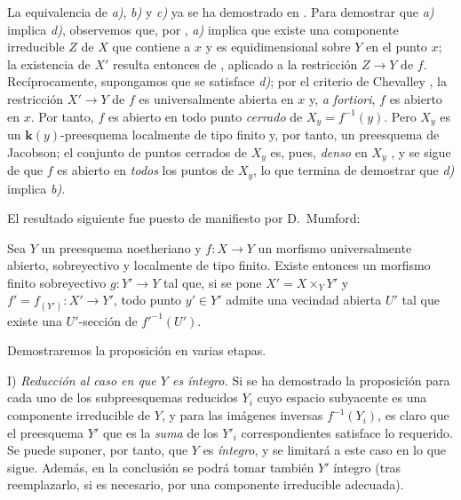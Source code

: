 La equivalencia de \emph{a)}, \emph{b)} y \emph{c)} ya se ha demostrado en .
Para demostrar que \emph{a)} implica \emph{d)}, observemos que, por , \emph{a)} implica que existe una componente irreducible $Z$ de $X$ que contiene a $x$ y es equidimensional sobre $Y$ en el punto $x$; la existencia de $X'$ resulta entonces de , aplicado a la restricción $Z\to Y$ de $f$.
Recíprocamente, supongamos que se satisface \emph{d)}; por el criterio de Chevalley , la restricción $X'\to Y$ de $f$ es universalmente abierta en $x$ y, \emph{a fortiori}, $f$ es abierto en $x$. Por tanto, $f$ es abierto en todo punto \emph{cerrado} de $X_y=f^{-1}(y)$.
Pero $X_y$ es un $\boldsymbol{k}(y)$-preesquema localmente de tipo finito y, por tanto, un preesquema de Jacobson; el conjunto de puntos cerrados de $X_y$ es, pues, \emph{denso} en $X_y$ , y se sigue de  que $f$ es abierto en \emph{todos} los puntos de $X_y$, lo que termina de demostrar que \emph{d)} implica \emph{b)}.

El resultado siguiente fue puesto de manifiesto por D.\ Mumford:

\begin{proposition}[14.5.10]
\label{IV.14.5.10}

Sea $Y$ un preesquema noetheriano y $f:X\to Y$ un morfismo universalmente abierto, sobreyectivo y localmente de tipo finito.
Existe entonces un morfismo finito sobreyectivo $g:Y'\to Y$ tal que, si se pone $X'=X\times_Y Y'$ y $f'=f_{(Y')}:X'\to Y'$, todo punto $y'\in Y'$ admite una vecindad abierta $U'$ tal que existe una $U'$-sección de $f'^{-1}(U')$.
\end{proposition}

Demostraremos la proposición en varias etapas.


I) \emph{Reducción al caso en que $Y$ es íntegro.}
Si se ha demostrado la proposición para cada uno de los subpreesquemas reducidos $Y_i$ cuyo espacio subyacente es una componente irreducible de $Y$, y para las imágenes inversas $f^{-1}(Y_i)$, es claro que el preesquema $Y'$ que es la \emph{suma} de los $Y'_i$ correspondientes satisface lo requerido.
Se puede suponer, por tanto, que $Y$ es \emph{íntegro}, y se limitará a este caso en lo que sigue.
Además, en la conclusión se podrá tomar también $Y'$ íntegro (tras reemplazarlo, si es necesario, por una componente irreducible adecuada).

